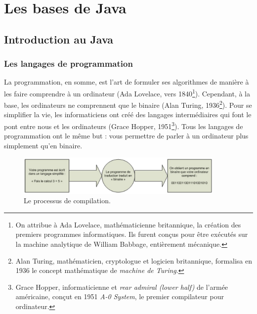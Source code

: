 \documentclass[12pt]{report}
\begin{document}

\part{Les bases de Java}

\chapter{Introduction au Java}
%
%
%
\section{Les langages de programmation}
La programmation, en somme, est l'art de formuler ses algorithmes de manière à les faire comprendre à un ordinateur (Ada Lovelace, vers 1840\footnote{On attribue à Ada Lovelace, mathématicienne britannique, la création des premiers programmes informatiques. Ils furent conçus pour être exécutés sur la machine analytique de William Babbage, entièrement mécanique.}). Cependant, à la base, les ordinateurs ne comprennent que le binaire (Alan Turing, 1936\footnote{Alan Turing, mathématicien, cryptologue et logicien britannique, formalisa en 1936 le concept mathématique de \emph{machine de Turing}.}). Pour se simplifier la vie, les informaticiens ont créé des langages intermédiaires qui font le pont entre nous et les ordinateurs (Grace Hopper, 1951\footnote{Grace Hopper, informaticienne et \emph{rear admiral (lower half)} de l'armée américaine, conçut en 1951 \emph{A-0 System}, le premier compilateur pour ordinateur.}). Tous les langages de programmation ont le même but : vous permettre de parler à un ordinateur plus simplement qu'en binaire.
%
%
%
\begin{figure}[!htbp]
  \centering
  \includegraphics[width=0.9\textwidth]{compilation.png}
  \caption{Le processus de compilation.}
\end{figure}
\end{document}
